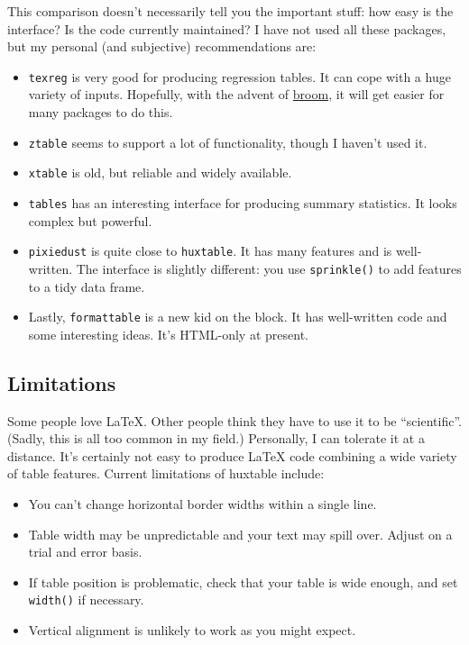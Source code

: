 \documentclass[]{article}
\providecommand{\tightlist}{%
  \setlength{\itemsep}{0pt}\setlength{\parskip}{0pt}}
\begin{document}
This comparison doesn't necessarily tell you the important stuff: how
easy is the interface? Is the code currently maintained? I have not used
all these packages, but my personal (and subjective) recommendations
are:

\begin{itemize}
\tightlist
\item
  \texttt{texreg} is very good for producing regression tables. It can
  cope with a huge variety of inputs. Hopefully, with the advent of
  \href{https://CRAN.R-project.org/package=broom}{broom}, it will get
  easier for many packages to do this.
\item
  \texttt{ztable} seems to support a lot of functionality, though I
  haven't used it.
\item
  \texttt{xtable} is old, but reliable and widely available.
\item
  \texttt{tables} has an interesting interface for producing summary
  statistics. It looks complex but powerful.
\item
  \texttt{pixiedust} is quite close to \texttt{huxtable}. It has many
  features and is well-written. The interface is slightly different: you
  use \texttt{sprinkle()} to add features to a tidy data frame.
\item
  Lastly, \texttt{formattable} is a new kid on the block. It has
  well-written code and some interesting ideas. It's HTML-only at
  present.
\end{itemize}

\hypertarget{limitations}{%
\subsection{Limitations}\label{limitations}}

Some people love LaTeX. Other people think they have to use it to be
``scientific''. (Sadly, this is all too common in my field.) Personally,
I can tolerate it at a distance. It's certainly not easy to produce
LaTeX code combining a wide variety of table features. Current
limitations of huxtable include:

\begin{itemize}
\tightlist
\item
  You can't change horizontal border widths within a single line.
\item
  Table width may be unpredictable and your text may spill over. Adjust
  on a trial and error basis.
\item
  If table position is problematic, check that your table is wide
  enough, and set \texttt{width()} if necessary.
\item
  Vertical alignment is unlikely to work as you might expect.
\end{itemize}
\end{document}
